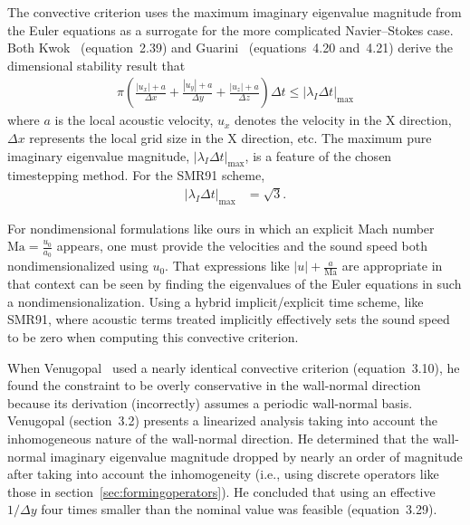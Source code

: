 \documentclass[letterpaper,11pt,nointlimits,reqno,draft]{amsart}
\begin{document}
The convective criterion uses the maximum imaginary eigenvalue magnitude from
the Euler equations as a surrogate for the more complicated Navier--Stokes
case.  Both Kwok~\cite{Kwok2002} (equation~2.39) and Guarini~\cite{Guarini1998}
(equations~4.20 and~4.21) derive the dimensional stability result that
\begin{align}\label{eq:convectivestability}
  \pi\left(
      \frac{\left|u_{x}\right| + a}{\Delta{}x}
    + \frac{\left|u_{y}\right| + a}{\Delta{}y}
    + \frac{\left|u_{z}\right| + a}{\Delta{}z}
  \right) \Delta{}t \leq \left|\lambda_{I}\Delta{}t\right|_{\mbox{max}}
\end{align}
where $a$ is the local acoustic velocity, $u_{x}$ denotes the velocity in the X
direction, $\Delta{}x$ represents the local grid size in the X direction, etc.
The maximum pure imaginary eigenvalue magnitude,
$\left|\lambda_{I}\Delta{}t\right|_{\mbox{max}}$, is a feature of the chosen
timestepping method.  For the SMR91 scheme,
\begin{align}
  \left|\lambda_{I}\Delta{}t\right|_{\mbox{max}} &= \sqrt{3}.
\end{align}

For nondimensional formulations like ours in which an explicit Mach number
$\mbox{Ma}=\frac{u_0}{a_0}$ appears, one must provide the velocities and the
sound speed both nondimensionalized using $u_0$.  That expressions like
$\left|u\right| + \frac{a}{\mbox{Ma}}$ are appropriate in that context can be
seen by finding the eigenvalues of the Euler equations in such a
nondimensionalization.  Using a hybrid implicit/explicit time scheme, like
SMR91, where acoustic terms treated implicitly effectively sets the sound speed
to be zero when computing this convective criterion.

When Venugopal~\cite{Venugopal2003} used a nearly identical convective
criterion (equation~3.10), he found the constraint to be overly conservative in
the wall-normal direction because its derivation (incorrectly) assumes a
periodic wall-normal basis.  Venugopal (section~3.2) presents a linearized
analysis taking into account the inhomogeneous nature of the wall-normal
direction.  He determined that the wall-normal imaginary eigenvalue magnitude
dropped by nearly an order of magnitude after taking into account the
inhomogeneity (i.e., using discrete operators like those in
section~\ref{sec:formingoperators}).  He concluded that using an effective
$1/\Delta{}y$ four times smaller than the nominal value was feasible
(equation~3.29).
\end{document}
